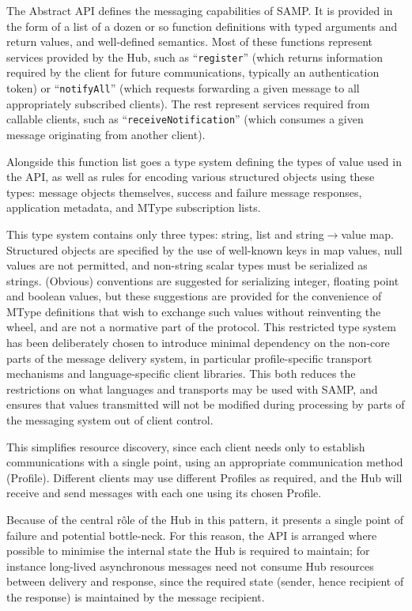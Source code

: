 \documentclass[5p]{elsarticle}
\begin{document}
The Abstract API defines the messaging capabilities of SAMP.
It is provided in the form of a list of a dozen or so function definitions
with typed arguments and return values, and well-defined semantics.
Most of these functions represent services provided by the Hub, such as
``{\tt register}'' (which returns information required by the
client for future communications, typically an authentication token)
or ``{\tt notifyAll}'' (which requests forwarding a given message to
all appropriately subscribed clients).
The rest represent services required from callable clients, such as
``{\tt receiveNotification}'' (which consumes a given message originating
from another client).

Alongside this function list goes a type system defining the types of value
used in the API, as well as rules for encoding various structured objects
using these types: message objects themselves, success and failure
message responses, application metadata, and MType subscription lists.

This type system contains only three types:
string, list and string$\rightarrow$value map.
Structured objects are specified by the use of well-known keys in map values,
null values are not permitted,
and non-string scalar types must be serialized as strings.
(Obvious) conventions are suggested for serializing
integer, floating point and boolean values,
but these suggestions are provided for the convenience
of MType definitions that wish to exchange such values without
reinventing the wheel, and are not a normative part of the protocol.
This restricted type system has been deliberately chosen to introduce
minimal dependency on the non-core parts of the message delivery system,
in particular profile-specific transport mechanisms and language-specific
client libraries.
This both reduces the restrictions on what languages and transports
may be used with SAMP, and ensures that values transmitted will
not be modified during processing by parts of the messaging system
out of client control.

This simplifies resource discovery, since each client needs only to
establish communications with a single point, using an appropriate
communication method (Profile).
Different clients may use different Profiles as required,
and the Hub will receive and send messages with each one using its
chosen Profile.

Because of the central r\^{o}le of the Hub in this pattern,
it presents a single point of failure and potential bottle-neck.
For this reason, the API is arranged where possible
to minimise the internal state the Hub is required to maintain;
for instance long-lived asynchronous messages need not consume
Hub resources between delivery and response, since the required
state (sender, hence recipient of the response) is maintained
by the message recipient.
\end{document}
